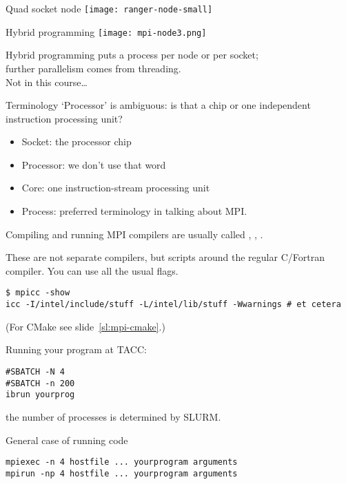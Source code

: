 \begin{numberedframe}{Quad socket node}
  \texttt{[image: ranger-node-small]}
\end{numberedframe}

\begin{numberedframe}{Hybrid programming}
  \texttt{[image: mpi-node3.png]}

  Hybrid programming puts a process per node or per socket;\\
  further parallelism comes from threading.\\
  Not in this course\ldots
\end{numberedframe}

\begin{numberedframe}{Terminology}
  `Processor' is ambiguous: is that a chip or one independent
  instruction processing unit?
  \begin{itemize}
  \item Socket: the processor chip
  \item Processor: we don't use that word
  \item Core: one instruction-stream processing unit
  \item Process: preferred terminology in talking about MPI.
  \end{itemize}  
\end{numberedframe}

\begin{numberedframe}{Compiling and running}
  \scriptsize
  MPI compilers are usually called ,
  , .

  These are not separate compilers,
  but scripts around the regular C/Fortran compiler. You can use all
  the usual flags.
\begin{verbatim}
$ mpicc -show
icc -I/intel/include/stuff -L/intel/lib/stuff -Wwarnings # et cetera
\end{verbatim}
\begin{full}
  (For CMake see slide~\ref{sl:mpi-cmake}.)
\end{full}

\begin{tacc}
  Running your program at TACC:
\begin{verbatim}
#SBATCH -N 4
#SBATCH -n 200
ibrun yourprog
\end{verbatim}
  the number of processes is determined by SLURM.
\end{tacc}
General case of running code
\begin{verbatim}
mpiexec -n 4 hostfile ... yourprogram arguments
mpirun -np 4 hostfile ... yourprogram arguments
\end{verbatim}
\end{numberedframe}


